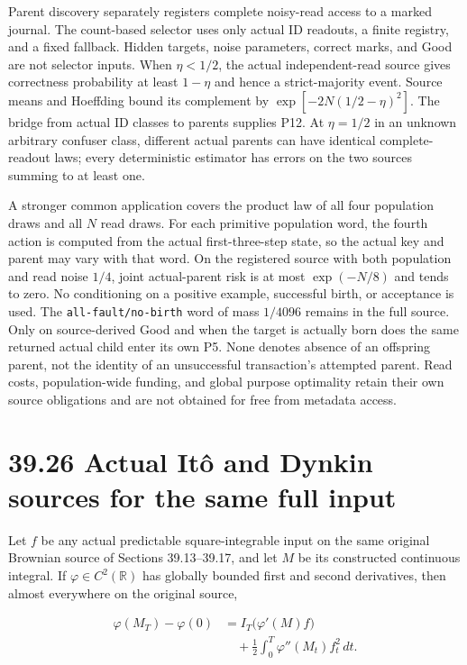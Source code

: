\documentclass[
  english,
  11pt,
  oneside]{book}
\begin{document}
Parent discovery separately registers complete noisy-read access to a marked journal. The count-based selector uses only actual ID readouts, a finite registry, and a fixed fallback. Hidden targets, noise parameters, correct marks, and Good are not selector inputs. When \(\eta<1/2\), the actual independent-read source gives correctness probability at least \(1-\eta\) and hence a strict-majority event. Source means and Hoeffding bound its complement by \(\exp[-2N(1/2-\eta)^2]\). The bridge from actual ID classes to parents supplies P12. At \(\eta=1/2\) in an unknown arbitrary confuser class, different actual parents can have identical complete-readout laws; every deterministic estimator has errors on the two sources summing to at least one.

A stronger common application covers the product law of all four population draws and all \(N\) read draws. For each primitive population word, the fourth action is computed from the actual first-three-step state, so the actual key and parent may vary with that word. On the registered source with both population and read noise \(1/4\), joint actual-parent risk is at most \(\exp(-N/8)\) and tends to zero. No conditioning on a positive example, successful birth, or acceptance is used. The \nolinkurl{all-fault/no-birth} word of mass \(1/4096\) remains in the full source. Only on source-derived Good and when the target is actually born does the same returned actual child enter its own P5. None denotes absence of an offspring parent, not the identity of an unsuccessful transaction's attempted parent. Read costs, population-wide funding, and global purpose optimality retain their own source obligations and are not obtained for free from metadata access.

\section{39.26 Actual Itô and Dynkin sources for the same full input}\label{actual-ituxf4-and-dynkin-sources-for-the-same-full-input}

Let \(f\) be any actual predictable square-integrable input on the same original Brownian source of Sections 39.13--39.17, and let \(M\) be its constructed continuous integral. If \(\varphi\in C^2(\mathbb R)\) has globally bounded first and second derivatives, then almost everywhere on the original source,

\[\begin{aligned}
\varphi(M_T)-\varphi(0)
&=I_T\bigl(\varphi'(M)f\bigr)\\
&\quad+\frac12\int_0^T\varphi''(M_t)f_t^2\,dt.
\end{aligned}\]
\end{document}

